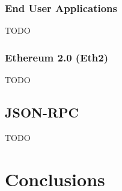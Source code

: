 \documentclass[a4paper, 12pt]{article} %
\begin{document}
        \subsubsection{End User Applications}
            TODO
            
        \subsubsection{Ethereum 2.0 (Eth2)}
            TODO

    \subsection{JSON-RPC}
                TODO
            
\section{Conclusions}

\nocite{*} %
\printbibliography[heading=bibnumbered] %
\end{document}
